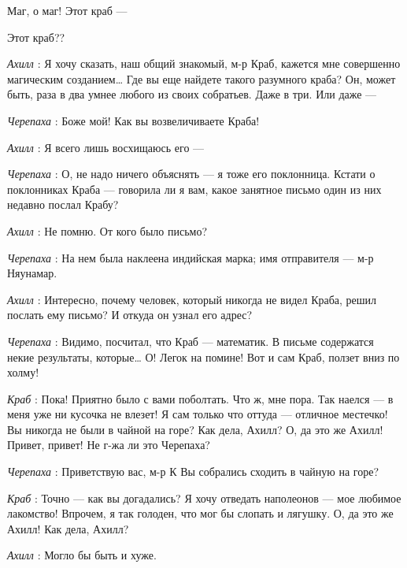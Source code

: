 \documentclass[../main.tex]{subfiles}
\begin{document}


\begin{dialogue}

 Маг, о маг! Этот краб ---

 Этот краб??

\emph{Ахилл} : Я хочу сказать, наш общий знакомый, м-р Краб, кажется мне совершенно магическим созданием\ldots{} Где вы еще найдете такого разумного краба? Он, может быть, раза в два умнее любого из своих собратьев. Даже в три. Или даже ---

\emph{Черепаха} : Боже мой! Как вы возвеличиваете Краба!

\emph{Ахилл} : Я всего лишь восхищаюсь его ---

\emph{Черепаха} : О, не надо ничего объяснять --- я тоже его поклонница. Кстати о поклонниках Краба --- говорила ли я вам, какое занятное письмо один из них недавно послал Крабу?

\emph{Ахилл} : Не помню. От кого было письмо?

\emph{Черепаха} : На нем была наклеена индийская марка; имя отправителя --- м-р Няунамар.

\emph{Ахилл} : Интересно, почему человек, который никогда не видел Краба, решил послать ему письмо? И откуда он узнал его адрес?

\emph{Черепаха} : Видимо, посчитал, что Краб --- математик. В письме содержатся некие результаты, которые\ldots{} О! Легок на помине! Вот и сам Краб, ползет вниз по холму!

\emph{Краб} : Пока! Приятно было с вами поболтать. Что ж, мне пора. Так наелся --- в меня уже ни кусочка не влезет! Я сам только что оттуда --- отличное местечко! Вы никогда не были в чайной на горе? Как дела, Ахилл? О, да это же Ахилл! Привет, привет! Не г-жа ли это Черепаха?

\emph{Черепаха} : Приветствую вас, м-р К Вы собрались сходить в чайную на горе?

\emph{Краб} : Точно --- как вы догадались? Я хочу отведать наполеонов --- мое любимое лакомство! Впрочем, я так голоден, что мог бы слопать и лягушку. О, да это же Ахилл! Как дела, Ахилл?

\emph{Ахилл} : Могло бы быть и хуже.


\end{dialogue}
\end{document}
